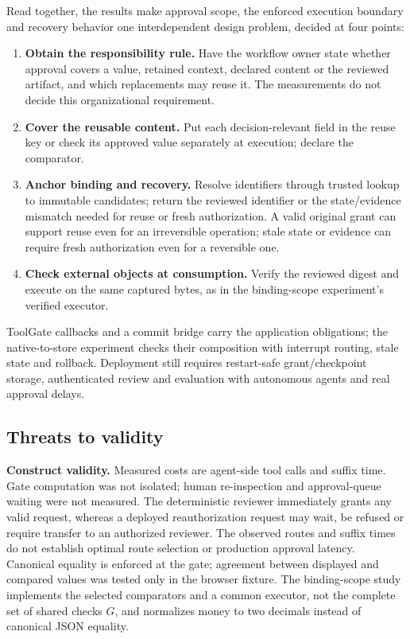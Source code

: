 \documentclass[pdflatex,sn-basic]{sn-jnl}
\providecommand{\tightlist}{\setlength{\itemsep}{0pt}\setlength{\parskip}{0pt}}
\begin{document}
Read together, the results make approval scope, the enforced execution boundary and recovery behavior one interdependent design problem, decided at four points:
\begin{enumerate}
\tightlist
\item \textbf{Obtain the responsibility rule.} Have the workflow owner state whether approval covers a value, retained context, declared content or the reviewed artifact, and which replacements may reuse it. The measurements do not decide this organizational requirement.
\item \textbf{Cover the reusable content.} Put each decision-relevant field in the reuse key or check its approved value separately at execution; declare the comparator.
\item \textbf{Anchor binding and recovery.} Resolve identifiers through trusted lookup to immutable candidates; return the reviewed identifier or the state/evidence mismatch needed for reuse or fresh authorization. A valid original grant can support reuse even for an irreversible operation; stale state or evidence can require fresh authorization even for a reversible one.
\item \textbf{Check external objects at consumption.} Verify the reviewed digest and execute on the same captured bytes, as in the binding-scope experiment's verified executor.
\end{enumerate}

ToolGate callbacks and a commit bridge carry the application obligations; the native-to-store experiment checks their composition with interrupt routing, stale state and rollback. Deployment still requires restart-safe grant/checkpoint storage, authenticated review and evaluation with autonomous agents and real approval delays.

\subsection{Threats to validity}\label{threats-to-validity}

\textbf{Construct validity.} Measured costs are agent-side tool calls and suffix time. Gate computation was not isolated; human re-inspection and approval-queue waiting were not measured. The deterministic reviewer immediately grants any valid request, whereas a deployed reauthorization request may wait, be refused or require transfer to an authorized reviewer. The observed routes and suffix times do not establish optimal route selection or production approval latency. Canonical equality is enforced at the gate; agreement between displayed and compared values was tested only in the browser fixture. The binding-scope study implements the selected comparators and a common executor, not the complete set of shared checks \(G\), and normalizes money to two decimals instead of canonical JSON equality.
\end{document}
